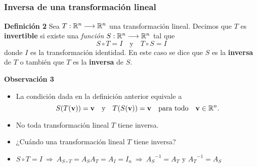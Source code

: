 
\subsection{}

{\nologo
\begin{frame}\frametitle{Inversa de una transformación lineal}
	\begin{block}{\textbf{Definición 2}}
		Sea $T:\mathbb{R}^n\longrightarrow\mathbb{R}^n$ una transformación lineal. Decimos que $T$ es \textbf{invertible} si existe una \textit{función} $S:\mathbb{R}^n\longrightarrow\mathbb{R}^n$  tal que
		\[
		S\circ T=I \quad\text{y}\quad T\circ S=I
		\]
		donde $I$ es la transformación identidad. En este caso se dice que $S$ es la \textbf{inversa} de $T$ o 
		también que $T$ es la \textbf{inversa} de $S$.
	\end{block}	
	
	\begin{alertblock}{\textbf{Observación 3}}
		
		\begin{itemize}
			\justifying
			\item[\labelname{$a$}] La condición dada en la definición anterior equivale a 
			\[
			S(T(\mathbf{v}))=\mathbf{v} \quad\text{y}\quad T(S(\mathbf{v}))=\mathbf{v} \quad \text{para todo} \quad \mathbf{v}\in\mathbb{R}^n.
			\] 
			\item[\labelname{$b$}] No toda transformación lineal $T$ tiene inversa. 
			\item[\labelname{$c$}] ¿Cuándo una transformación lineal $T$ tiene inversa? 
			\item[\labelname{$d$}] $S\circ T = I \  \Rightarrow \ A_{S\circ T} = A_SA_T = A_I = I_n
			\  \Rightarrow \  {A_S}^{-1} = A_T \text{ y } {A_T}^{-1} = A_S$
		\end{itemize}
	\end{alertblock}
\end{frame}
}


